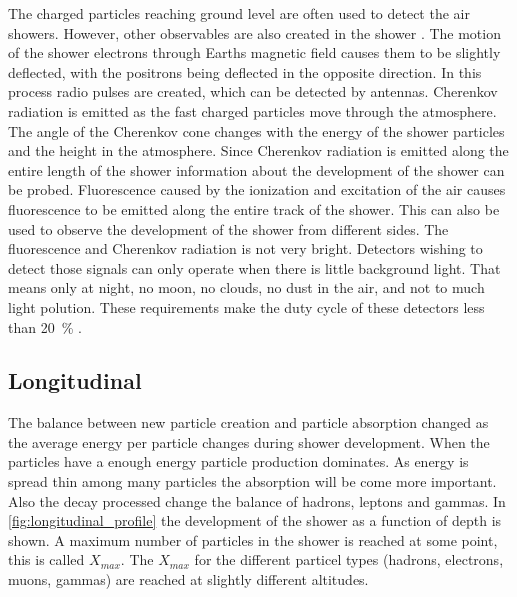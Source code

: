 The charged particles reaching ground level are often used to detect the air showers. However, other observables are also created in the shower \cite{grieder2010eas}. The motion of the shower electrons through Earths magnetic field causes them to be slightly deflected, with the positrons being deflected in the opposite direction. In this process radio pulses are created, which can be detected by antennas. Cherenkov radiation is emitted as the fast charged particles move through the atmosphere. The angle of the Cherenkov cone changes with the energy of the shower particles and the height in the atmosphere. Since Cherenkov radiation is emitted along the entire length of the shower information about the development of the shower can be probed. Fluorescence caused by the ionization and excitation of the air causes fluorescence to be emitted along the entire track of the shower. This can also be used to observe the development of the shower from different sides. The fluorescence and Cherenkov radiation is not very bright. Detectors wishing to detect those signals can only operate when there is little background light. That means only at night, no moon, no clouds, no dust in the air, and not to much light polution. These requirements make the duty cycle of these detectors less than \SI{20}{\percent} \cite{abraham2004auger}.


\subsection{Longitudinal}

The balance between new particle creation and particle absorption changed as the average energy per particle changes during shower development. When the particles have a enough energy particle production dominates. As energy is spread thin among many particles the absorption will be come more important. Also the decay processed change the balance of hadrons, leptons and gammas. In \cref{fig:longitudinal_profile} the development of the shower as a function of depth is shown. A maximum number of particles in the shower is reached at some point, this is called $X_{max}$. The $X_{max}$ for the different particel types (hadrons, electrons, muons, gammas) are reached at slightly different altitudes.


